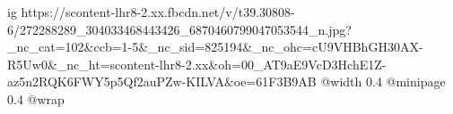 
 
 
 
 

\ifcmt
  ig https://scontent-lhr8-2.xx.fbcdn.net/v/t39.30808-6/272288289_304033468443426_6870460799047053544_n.jpg?_nc_cat=102&ccb=1-5&_nc_sid=825194&_nc_ohc=cU9VHBhGH30AX-R5Uw0&_nc_ht=scontent-lhr8-2.xx&oh=00_AT9aE9VcD3HchE1Z-az5n2RQK6FWY5p5Qf2auPZw-KILVA&oe=61F3B9AB
  @width 0.4
  @minipage 0.4
  @wrap \parpic[r]
\fi
